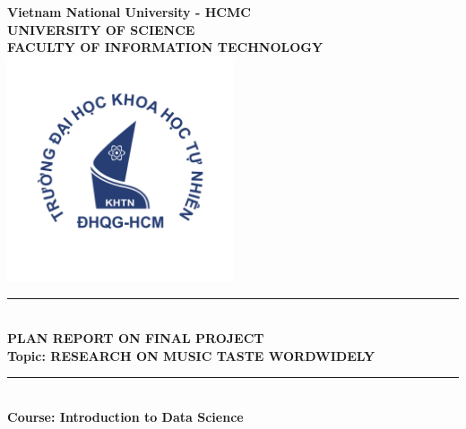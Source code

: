 \documentclass[13pt]{article}
\newcommand{\HRule}{\textcolor{myblue}{\rule{\linewidth}{0.5mm}}}
\begin{document}
\begin{titlepage}
    \centering

    
    {\textbf{\Huge Vietnam National University - HCMC}}\\[0.6cm]
    {\textbf{\LARGE UNIVERSITY OF SCIENCE}}\\[0.4cm]
    {\textbf{\large FACULTY OF INFORMATION TECHNOLOGY}}\\[0.4cm]
    \includegraphics[width=0.5\textwidth]{img/Logo.png} \\
    
    \HRule \\[0.4cm]
    { 
    \LARGE{\bfseries PLAN REPORT ON FINAL PROJECT}\\[0.5cm]
    \large{\bfseries Topic: RESEARCH ON MUSIC TASTE WORDWIDELY}
    }\\[0.4cm]
    \HRule \\[1cm]
    
    \textbf{\LARGE Course: Introduction to Data Science}\\[0.5cm]
    

\end{titlepage}
\end{document}
